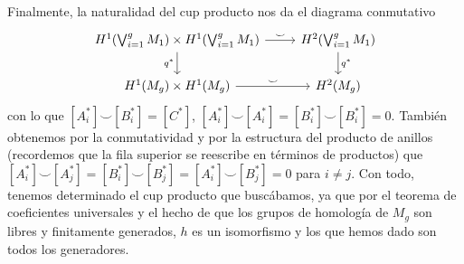 \documentclass[twoside]{article}
\begin{document}
\begin{solucion}
Finalmente, la naturalidad del cup producto nos da el diagrama conmutativo
\[
\begin{tikzcd}
H^1(\bigvee_{i=1}^g M_1)\times H^1(\bigvee_{i=1}^g M_1) \arrow[r, "\smile"] \arrow[d, "q^*"'] & H^2(\bigvee_{i=1}^gM_1) \arrow[d, "q^*"] \\
H^1(M_g)\times H^1(M_g) \arrow[r, "\smile"] & H^2(M_g)
\end{tikzcd}
\]
con lo que $[A_i^*]\smile [B_i^*]=[C^*]$, $[A_i^*]\smile [A_i^*]=[B_i^*]\smile [B_i^*]=0$. También obtenemos por la conmutatividad y por la estructura del producto de anillos (recordemos que la fila superior se reescribe en términos de productos) que $[A_i^*]\smile [A_j^*]=[B_i^*]\smile [B_j^*]=[A_i^*]\smile [B_j^*]=0$ para $i\neq j$. Con todo, tenemos determinado el cup producto que buscábamos, ya que por el teorema de coeficientes universales y el hecho de que los grupos de homología de $M_g$ son libres y finitamente generados, $h$ es un isomorfismo y los que hemos dado son todos los generadores. 



%
\end{solucion}

\newpage
\end{document}
